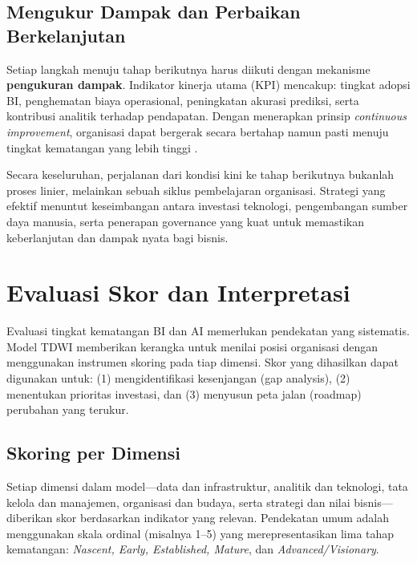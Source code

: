\subsection*{Mengukur Dampak dan Perbaikan Berkelanjutan}
Setiap langkah menuju tahap berikutnya harus diikuti dengan mekanisme \textbf{pengukuran dampak}. 
Indikator kinerja utama (KPI) mencakup: tingkat adopsi BI, penghematan biaya operasional, 
peningkatan akurasi prediksi, serta kontribusi analitik terhadap pendapatan. 
Dengan menerapkan prinsip \textit{continuous improvement}, organisasi dapat bergerak secara 
bertahap namun pasti menuju tingkat kematangan yang lebih tinggi \cite{ekambaram2021}.  

Secara keseluruhan, perjalanan dari kondisi kini ke tahap berikutnya bukanlah proses linier, 
melainkan sebuah siklus pembelajaran organisasi. Strategi yang efektif menuntut keseimbangan 
antara investasi teknologi, pengembangan sumber daya manusia, serta penerapan governance 
yang kuat untuk memastikan keberlanjutan dan dampak nyata bagi bisnis.

\section{Evaluasi Skor dan Interpretasi}

Evaluasi tingkat kematangan BI dan AI memerlukan pendekatan yang sistematis. 
Model TDWI memberikan kerangka untuk menilai posisi organisasi dengan 
menggunakan instrumen skoring pada tiap dimensi. Skor yang dihasilkan 
dapat digunakan untuk: (1) mengidentifikasi kesenjangan (gap analysis), 
(2) menentukan prioritas investasi, dan (3) menyusun peta jalan (roadmap) 
perubahan yang terukur.

\subsection{Skoring per Dimensi}

Setiap dimensi dalam model—data dan infrastruktur, analitik dan teknologi, 
tata kelola dan manajemen, organisasi dan budaya, serta strategi dan nilai bisnis—
diberikan skor berdasarkan indikator yang relevan. 
Pendekatan umum adalah menggunakan skala ordinal (misalnya 1–5) yang 
merepresentasikan lima tahap kematangan: \textit{Nascent, Early, Established, Mature}, 
dan \textit{Advanced/Visionary}.  

